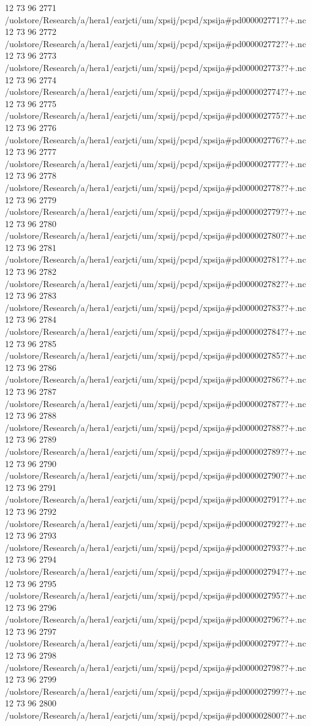 12 73 96
2771
/uolstore/Research/a/hera1/earjcti/um/xpsij/pcpd/xpsija#pd000002771??+.nc
12 73 96
2772
/uolstore/Research/a/hera1/earjcti/um/xpsij/pcpd/xpsija#pd000002772??+.nc
12 73 96
2773
/uolstore/Research/a/hera1/earjcti/um/xpsij/pcpd/xpsija#pd000002773??+.nc
12 73 96
2774
/uolstore/Research/a/hera1/earjcti/um/xpsij/pcpd/xpsija#pd000002774??+.nc
12 73 96
2775
/uolstore/Research/a/hera1/earjcti/um/xpsij/pcpd/xpsija#pd000002775??+.nc
12 73 96
2776
/uolstore/Research/a/hera1/earjcti/um/xpsij/pcpd/xpsija#pd000002776??+.nc
12 73 96
2777
/uolstore/Research/a/hera1/earjcti/um/xpsij/pcpd/xpsija#pd000002777??+.nc
12 73 96
2778
/uolstore/Research/a/hera1/earjcti/um/xpsij/pcpd/xpsija#pd000002778??+.nc
12 73 96
2779
/uolstore/Research/a/hera1/earjcti/um/xpsij/pcpd/xpsija#pd000002779??+.nc
12 73 96
2780
/uolstore/Research/a/hera1/earjcti/um/xpsij/pcpd/xpsija#pd000002780??+.nc
12 73 96
2781
/uolstore/Research/a/hera1/earjcti/um/xpsij/pcpd/xpsija#pd000002781??+.nc
12 73 96
2782
/uolstore/Research/a/hera1/earjcti/um/xpsij/pcpd/xpsija#pd000002782??+.nc
12 73 96
2783
/uolstore/Research/a/hera1/earjcti/um/xpsij/pcpd/xpsija#pd000002783??+.nc
12 73 96
2784
/uolstore/Research/a/hera1/earjcti/um/xpsij/pcpd/xpsija#pd000002784??+.nc
12 73 96
2785
/uolstore/Research/a/hera1/earjcti/um/xpsij/pcpd/xpsija#pd000002785??+.nc
12 73 96
2786
/uolstore/Research/a/hera1/earjcti/um/xpsij/pcpd/xpsija#pd000002786??+.nc
12 73 96
2787
/uolstore/Research/a/hera1/earjcti/um/xpsij/pcpd/xpsija#pd000002787??+.nc
12 73 96
2788
/uolstore/Research/a/hera1/earjcti/um/xpsij/pcpd/xpsija#pd000002788??+.nc
12 73 96
2789
/uolstore/Research/a/hera1/earjcti/um/xpsij/pcpd/xpsija#pd000002789??+.nc
12 73 96
2790
/uolstore/Research/a/hera1/earjcti/um/xpsij/pcpd/xpsija#pd000002790??+.nc
12 73 96
2791
/uolstore/Research/a/hera1/earjcti/um/xpsij/pcpd/xpsija#pd000002791??+.nc
12 73 96
2792
/uolstore/Research/a/hera1/earjcti/um/xpsij/pcpd/xpsija#pd000002792??+.nc
12 73 96
2793
/uolstore/Research/a/hera1/earjcti/um/xpsij/pcpd/xpsija#pd000002793??+.nc
12 73 96
2794
/uolstore/Research/a/hera1/earjcti/um/xpsij/pcpd/xpsija#pd000002794??+.nc
12 73 96
2795
/uolstore/Research/a/hera1/earjcti/um/xpsij/pcpd/xpsija#pd000002795??+.nc
12 73 96
2796
/uolstore/Research/a/hera1/earjcti/um/xpsij/pcpd/xpsija#pd000002796??+.nc
12 73 96
2797
/uolstore/Research/a/hera1/earjcti/um/xpsij/pcpd/xpsija#pd000002797??+.nc
12 73 96
2798
/uolstore/Research/a/hera1/earjcti/um/xpsij/pcpd/xpsija#pd000002798??+.nc
12 73 96
2799
/uolstore/Research/a/hera1/earjcti/um/xpsij/pcpd/xpsija#pd000002799??+.nc
12 73 96
2800
/uolstore/Research/a/hera1/earjcti/um/xpsij/pcpd/xpsija#pd000002800??+.nc

